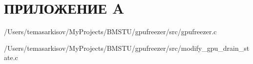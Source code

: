 \chapter*{ПРИЛОЖЕНИЕ A}

\begin{lstinputlisting}[
	caption={Исходный код загружаемого модуля ядра},
	label={lst:source},
	style={c},
	]{/Users/temasarkisov/MyProjects/BMSTU/gpufreezer/src/gpufreezer.c}
\end{lstinputlisting}

\begin{lstinputlisting}[
	caption={Исходный код программы в пространстве пользователя},
	label={lst:source},
	style={c},
	]{/Users/temasarkisov/MyProjects/BMSTU/gpufreezer/src/modify_gpu_drain_state.c}
\end{lstinputlisting}

\pagebreak